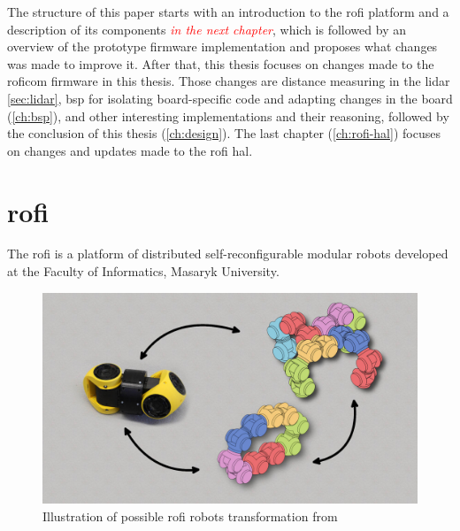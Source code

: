 \documentclass[
  digital,     %
  oneside,     %
  nosansbold,  %
  nocolorbold, %
  nolof,         %
  nolot,         %
]{fithesis4}
\newcommand{\TODO}[1]{\textcolor{red}{\textit{#1}}}
\newcommand{\TODOLIST}[1]{}
\begin{document}
The structure of this paper starts with an introduction to the \acrshort{rofi} platform and a description of its components \TODO{in the next chapter}, which is followed by an overview of the prototype firmware implementation and proposes what changes was made to improve it. After that, this thesis focuses on changes made to the \acrshort{roficom} firmware in this thesis. Those changes are distance measuring in the \acrshort{lidar} \autoref{sec:lidar}, \acrlong{bsp} for isolating board-specific code and adapting changes in the board (\autoref{ch:bsp}), and other interesting implementations and their reasoning, followed by the conclusion of this thesis (\autoref{ch:design}). The last chapter (\autoref{ch:rofi-hal}) focuses on changes and updates made to the \acrshort{rofi} \acrlong{hal}.

\chapter[ RoFI ]{ \acrshort{rofi} }
\TODOLIST{
\begin{itemize}
    \item Describe the platform
    \item Universal module
\end{itemize}
}

The \acrshort{rofi} is a platform of distributed self-reconfigurable modular robots developed at the Faculty of Informatics, Masaryk University.

\begin{figure}
    \includegraphics[width=\textwidth,height=\textheight,keepaspectratio]{assets/rofiTransformation.jpg}
    \caption[\acrshort{rofi} transformation]{Illustration of possible \acrshort{rofi} robots transformation from \TODO{\cite{rofiweb}}}
    \label{fig:rofi-transformation}
\end{figure}
\end{document}
